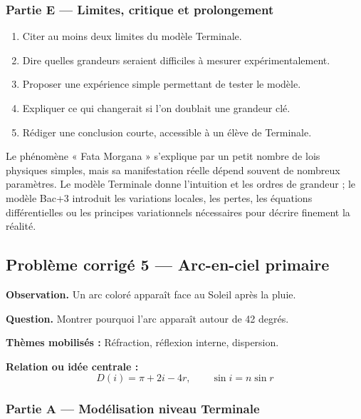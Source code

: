 \documentclass[11pt,a4paper]{article}
\begin{document}
\subsubsection*{Partie E — Limites, critique et prolongement}

\begin{enumerate}
  \item Citer au moins deux limites du modèle Terminale.
  \item Dire quelles grandeurs seraient difficiles à mesurer expérimentalement.
  \item Proposer une expérience simple permettant de tester le modèle.
  \item Expliquer ce qui changerait si l'on doublait une grandeur clé.
  \item Rédiger une conclusion courte, accessible à un élève de Terminale.
\end{enumerate}

\begin{corrigebox}
Le phénomène « Fata Morgana » s'explique par un petit nombre de lois physiques simples, mais sa manifestation réelle dépend souvent de nombreux paramètres. Le modèle Terminale donne l'intuition et les ordres de grandeur ; le modèle Bac+3 introduit les variations locales, les pertes, les équations différentielles ou les principes variationnels nécessaires pour décrire finement la réalité.
\end{corrigebox}

\subsection{Problème corrigé 5 — Arc-en-ciel primaire}

\begin{exercicebox}
\textbf{Observation.} Un arc coloré apparaît face au Soleil après la pluie.

\medskip
\textbf{Question.} Montrer pourquoi l'arc apparaît autour de 42 degrés.

\medskip
\textbf{Thèmes mobilisés :} Réfraction, réflexion interne, dispersion.

\medskip
\textbf{Relation ou idée centrale :}
\[
D(i)=\pi+2i-4r,\qquad \sin i=n\sin r
\]
\end{exercicebox}

\subsubsection*{Partie A — Modélisation niveau Terminale}
\end{document}
